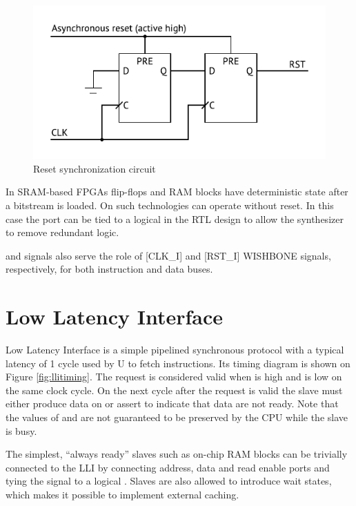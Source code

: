 \documentclass[a4paper,12pt,twoside,extrafontsizes]{memoir}
\begin{document}
\begin{figure}[htbp]
	\centering
	\includegraphics[scale=1]{images/resetsync.pdf}
	\caption{Reset synchronization circuit}
	\label{fig:resetsync}
\end{figure}

In SRAM-based FPGAs flip-flops and RAM blocks have deterministic state after a bitstream is loaded. On such technologies \lxp{} can operate without reset. In this case the  port can be tied to a logical  in the RTL design to allow the synthesizer to remove redundant logic.

 and  signals also serve the role of [CLK\_I] and [RST\_I] WISHBONE signals, respectively, for both instruction and data buses.

\section{Low Latency Interface}
\label{sec:lli}

Low Latency Interface is a simple pipelined synchronous protocol with a typical latency of 1 cycle used by \lxp{}U to fetch instructions. Its timing diagram is shown on Figure \ref{fig:llitiming}. The request is considered valid when  is high and  is low on the same clock cycle. On the next cycle after the request is valid the slave must either produce data on  or assert  to indicate that data are not ready. Note that the values of  and  are not guaranteed to be preserved by the CPU while the slave is busy.

The simplest, ``always ready'' slaves such as on-chip RAM blocks can be trivially connected to the LLI by connecting address, data and read enable ports and tying the  signal to a logical . Slaves are also allowed to introduce wait states, which makes it possible to implement external caching.
\end{document}
